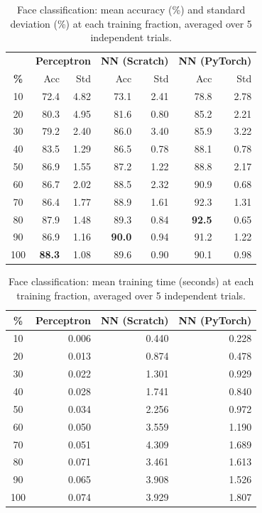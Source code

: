 \documentclass[12pt]{article}
\begin{document}
\begin{table}[H]
\centering
\caption{Face classification: mean accuracy (\%) and standard deviation (\%) at each
training fraction, averaged over 5 independent trials.}
\label{tab:faces_full}
\setlength{\tabcolsep}{5pt}
\begin{tabular}{c|rr|rr|rr}
\toprule
 & \multicolumn{2}{c|}{\textbf{Perceptron}}
 & \multicolumn{2}{c|}{\textbf{NN (Scratch)}}
 & \multicolumn{2}{c}{\textbf{NN (PyTorch)}} \\
\textbf{\%} & Acc & Std & Acc & Std & Acc & Std \\
\midrule
 10 & 72.4 & 4.82 & 73.1 & 2.41 & 78.8 & 2.78 \\
 20 & 80.3 & 4.95 & 81.6 & 0.80 & 85.2 & 2.21 \\
 30 & 79.2 & 2.40 & 86.0 & 3.40 & 85.9 & 3.22 \\
 40 & 83.5 & 1.29 & 86.5 & 0.78 & 88.1 & 0.78 \\
 50 & 86.9 & 1.55 & 87.2 & 1.22 & 88.8 & 2.17 \\
 60 & 86.7 & 2.02 & 88.5 & 2.32 & 90.9 & 0.68 \\
 70 & 86.4 & 1.77 & 88.9 & 1.61 & 92.3 & 1.31 \\
 80 & 87.9 & 1.48 & 89.3 & 0.84 & \textbf{92.5} & 0.65 \\
 90 & 86.9 & 1.16 & \textbf{90.0} & 0.94 & 91.2 & 1.22 \\
100 & \textbf{88.3} & 1.08 & 89.6 & 0.90 & 90.1 & 0.98 \\
\bottomrule
\end{tabular}
\end{table}

\begin{table}[H]
\centering
\caption{Face classification: mean training time (seconds) at each training fraction,
averaged over 5 independent trials.}
\label{tab:faces_time}
\setlength{\tabcolsep}{7pt}
\begin{tabular}{c|r|r|r}
\toprule
\textbf{\%} & \textbf{Perceptron} & \textbf{NN (Scratch)} & \textbf{NN (PyTorch)} \\
\midrule
 10 & 0.006 & 0.440 & 0.228 \\
 20 & 0.013 & 0.874 & 0.478 \\
 30 & 0.022 & 1.301 & 0.929 \\
 40 & 0.028 & 1.741 & 0.840 \\
 50 & 0.034 & 2.256 & 0.972 \\
 60 & 0.050 & 3.559 & 1.190 \\
 70 & 0.051 & 4.309 & 1.689 \\
 80 & 0.071 & 3.461 & 1.613 \\
 90 & 0.065 & 3.908 & 1.526 \\
100 & 0.074 & 3.929 & 1.807 \\
\bottomrule
\end{tabular}
\end{table}
\end{document}
